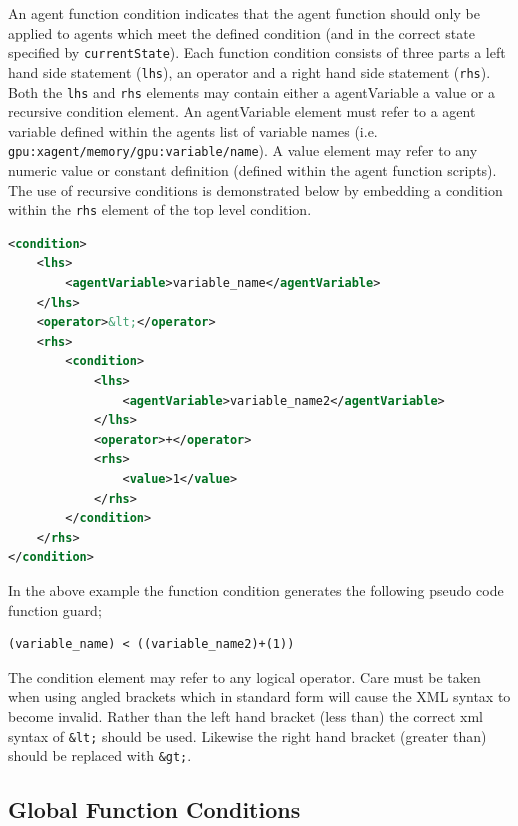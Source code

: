 \documentclass[11pt, a4paper, onecolumn, oneside]{report}
\begin{document}
An agent function condition indicates that the agent function should only be applied to agents which meet the defined condition (and in the correct state specified by \texttt{currentState}).
Each function condition consists of three parts a left hand side statement (\texttt{lhs}), an operator and a right hand side statement (\texttt{rhs}).
Both the \texttt{lhs} and \texttt{rhs} elements may contain either a agentVariable a value or a recursive condition element.
An agentVariable element must refer to a agent variable defined within the agents list of variable names (i.e.
\texttt{gpu:xagent/memory/gpu:variable/name}).
A value element may refer to any numeric value or constant definition (defined within the agent function scripts).
The use of recursive conditions is demonstrated below by embedding a condition within the \texttt{rhs} element of the top level condition.


\begin{lstlisting}[language=XML]
<condition>
    <lhs>
        <agentVariable>variable_name</agentVariable>
    </lhs>
    <operator>&lt;</operator>
    <rhs>
        <condition>
            <lhs>
                <agentVariable>variable_name2</agentVariable>
            </lhs>
            <operator>+</operator>
            <rhs>
                <value>1</value>
            </rhs>
        </condition>
    </rhs>
</condition>
\end{lstlisting}

In the above example the function condition generates the following pseudo code function guard;

\begin{lstlisting}[language=C_]
(variable_name) < ((variable_name2)+(1))
\end{lstlisting}

The condition element may refer to any logical operator.
Care must be taken when using angled brackets which in standard form will cause the XML syntax to become invalid.
Rather than the left hand bracket (less than) the correct xml syntax of 
\verb|&lt;| should be used.
Likewise the right hand bracket (greater than) should be replaced with 
\verb|&gt;|.


\subsection{Global Function Conditions}
\label{sec:255}
\end{document}
